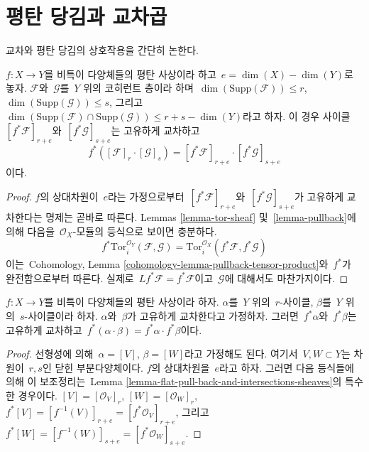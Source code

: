 \section{평탄 당김과 교차곱}
\label{section-flat-pullback-and-intersection-products}

\noindent
교차와 평탄 당김의 상호작용을 간단히 논한다.

\begin{lemma}
\label{lemma-flat-pull-back-and-intersections-sheaves}
$f : X \to Y$를 비특이 다양체들의 평탄 사상이라 하고\ 
$e = \dim(X) - \dim(Y)$로 놓자. $\mathcal{F}$와\  $\mathcal{G}$를\  $Y$ 위의
코히런트 층이라 하며\  $\dim(\text{Supp}(\mathcal{F})) \leq r$,
$\dim(\text{Supp}(\mathcal{G})) \leq s$, 그리고\ 
$\dim(\text{Supp}(\mathcal{F}) \cap \text{Supp}(\mathcal{G}) )
\leq r + s - \dim(Y)$라고 하자. 이 경우 사이클\ 
$[f^*\mathcal{F}]_{r + e}$와\  $[f^*\mathcal{G}]_{s + e}$는 고유하게 교차하고
$$
f^*([\mathcal{F}]_r \cdot [\mathcal{G}]_s) =
[f^*\mathcal{F}]_{r + e} \cdot [f^*\mathcal{G}]_{s + e}
$$
이다.
\end{lemma}

\begin{proof}
$f$의 상대차원이\  $e$라는 가정으로부터\ 
$[f^*\mathcal{F}]_{r + e}$와\  $[f^*\mathcal{G}]_{s + e}$가 고유하게
교차한다는 명제는 곧바로 따른다.
Lemmas \ref{lemma-tor-sheaf} 및\  \ref{lemma-pullback}에 의해 다음을\ 
$\mathcal{O}_X$-모듈의 등식으로 보이면 충분하다.
$$
f^*\text{Tor}_i^{\mathcal{O}_Y}(\mathcal{F}, \mathcal{G}) =
\text{Tor}_i^{\mathcal{O}_X}(f^*\mathcal{F}, f^*\mathcal{G})
$$
이는\  Cohomology, Lemma \ref{cohomology-lemma-pullback-tensor-product}와\ 
$f^*$가 완전함으로부터 따른다. 실제로\ 
$Lf^*\mathcal{F} = f^*\mathcal{F}$이고\  $\mathcal{G}$에 대해서도 마찬가지이다.
\end{proof}

\begin{lemma}
\label{lemma-flat-pullback-and-intersections}
$f : X \to Y$를 비특이 다양체들의 평탄 사상이라 하자.
$\alpha$를\  $Y$ 위의\  $r$-사이클, $\beta$를\  $Y$ 위의\  $s$-사이클이라 하자.
$\alpha$와\  $\beta$가 고유하게 교차한다고 가정하자. 그러면\ 
$f^*\alpha$와\  $f^*\beta$는 고유하게 교차하고\ 
$f^*( \alpha \cdot \beta ) = f^*\alpha \cdot f^*\beta$이다.
\end{lemma}

\begin{proof}
선형성에 의해\  $\alpha = [V]$, $\beta = [W]$라고 가정해도 된다.
여기서\  $V, W \subset Y$는 차원이\  $r, s$인 닫힌 부분다양체이다.
$f$의 상대차원을\  $e$라고 하자. 그러면 다음 등식들에 의해 이 보조정리는\ 
Lemma \ref{lemma-flat-pull-back-and-intersections-sheaves}의 특수한 경우이다.
$[V] = [\mathcal{O}_V]_r$, $[W] = [\mathcal{O}_W]_r$,
$f^*[V] = [f^{-1}(V)]_{r + e} = [f^*\mathcal{O}_V]_{r + e}$, 그리고\ 
$f^*[W] = [f^{-1}(W)]_{s + e} = [f^*\mathcal{O}_W]_{s + e}$.
\end{proof}


